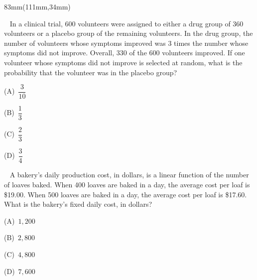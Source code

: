 \documentclass[a4paper]{article}
\newcommand{\RCOL}{111mm}
\newcommand{\COLW}{83mm}
\newcommand{\pnum}[1]{\fcolorbox{ink}{white}{\sffamily\bfseries\fontsize{8}{8}\selectfont #1}~}
\begin{document}
\begin{textblock*}{\COLW}(\RCOL,34mm)
{\fontsize{10.4}{13.4}\selectfont
\parbox[t][233mm][t]{\COLW}{%
\noindent\pnum{13} In a clinical trial, 600 volunteers were assigned to either a drug group of 360 volunteers or a placebo group of the remaining volunteers. In the drug group, the number of volunteers whose symptoms improved was 3 times the number whose symptoms did not improve. Overall, 330 of the 600 volunteers improved. If one volunteer whose symptoms did not improve is selected at random, what is the probability that the volunteer was in the placebo group?\par\vspace{2.2mm}
\noindent\hangindent=13mm\hspace*{7mm}(A)\ $\dfrac{3}{10}$\par
\vspace{1.8mm}\noindent\hangindent=13mm\hspace*{7mm}(B)\ $\dfrac{1}{3}$\par
\vspace{1.8mm}\noindent\hangindent=13mm\hspace*{7mm}(C)\ $\dfrac{2}{3}$\par
\vspace{1.8mm}\noindent\hangindent=13mm\hspace*{7mm}(D)\ $\dfrac{3}{4}$\par
\vfill

\noindent\pnum{14} A bakery's daily production cost, in dollars, is a linear function of the number of loaves baked. When 400 loaves are baked in a day, the average cost per loaf is \$19.00. When 500 loaves are baked in a day, the average cost per loaf is \$17.60. What is the bakery's fixed daily cost, in dollars?\par\vspace{2.2mm}
\noindent\hangindent=13mm\hspace*{7mm}(A)\ $1{,}200$\par
\vspace{1.8mm}\noindent\hangindent=13mm\hspace*{7mm}(B)\ $2{,}800$\par
\vspace{1.8mm}\noindent\hangindent=13mm\hspace*{7mm}(C)\ $4{,}800$\par
\vspace{1.8mm}\noindent\hangindent=13mm\hspace*{7mm}(D)\ $7{,}600$\par
\vfill

}}
\end{textblock*}
\end{document}
